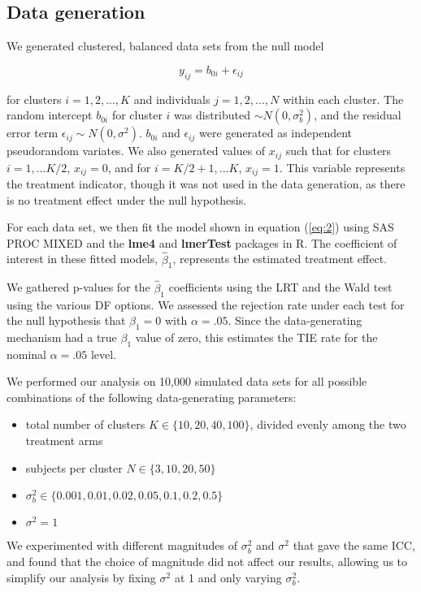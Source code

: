 \documentclass[twocolumn]{bmcart}%
\begin{document}
\subsection*{Data generation}

We generated clustered, balanced data sets from the null model

\begin{equation}
  \label{eq:3}
    y_{ij} = b_{0i} + \epsilon_{ij} 
\end{equation}


for clusters $i = 1, 2, ..., K$ and individuals $j = 1, 2, ..., N$ within each cluster. The random intercept $b_{0i}$ for cluster $i$ was distributed $\sim N(0, \sigma_b^2)$, and the residual error term $\epsilon_{ij} \sim N(0, \sigma^2)$.  $b_{0i}$ and $\epsilon_{ij}$ were generated as independent pseudorandom variates. We also generated values of $x_{ij}$ such that for clusters $i = 1, ... K/2$,  $x_{ij}=0$, and for $i = K/2 +1, ... K$, $x_{ij}=1$.  This variable represents the treatment indicator, though it was not used in the data generation, as there is no treatment effect under the null hypothesis.

For each data set, we then fit the model shown in equation (\ref{eq:2}) using SAS PROC MIXED and the \textbf{lme4} and \textbf{lmerTest} packages in R. The coefficient of interest in these fitted models, $\hat{\beta}_1$, represents the estimated treatment effect.

We gathered p-values for the $\hat{\beta}_1$ coefficients using the LRT and the Wald test using the various DF options.  We assessed the rejection rate under each test for the null hypothesis that $\beta_1=0$ with $\alpha=.05$.  Since the data-generating mechanism had a true $\beta_1$ value of zero, this estimates the TIE rate for the nominal $\alpha = .05$ level.

We performed our analysis on 10,000 simulated data sets for all possible combinations of the following data-generating parameters:
\begin{itemize}
 \item total number of clusters $K\in \{10, 20, 40, 100\}$, divided evenly among the two treatment arms
 
 \item subjects per cluster $N \in \{3, 10, 20, 50\}$
 
 \item $\sigma_b^2 \in \{0.001, 0.01, 0.02, 0.05, 0.1, 0.2, 0.5\}$
 
 \item $\sigma^2 = 1$
\end{itemize}
We experimented with different magnitudes of $\sigma_b^2$ and $\sigma^2$ that gave the same ICC, and found that the choice of magnitude did not affect our results, allowing us to simplify our analysis by fixing $\sigma^2$ at 1 and only varying $\sigma^2_b$.
\end{document}
